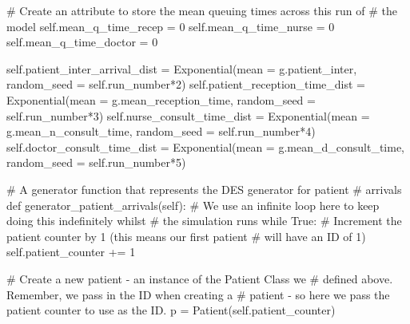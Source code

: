 \documentclass[
  letterpaper,
  DIV=11,
  numbers=noendperiod]{scrreprt}
\newenvironment{Shaded}{}{}
\newcommand{\CommentTok}[1]{\textcolor[rgb]{0.42,0.45,0.49}{#1}}
\newcommand{\ControlFlowTok}[1]{\textcolor[rgb]{0.84,0.23,0.29}{#1}}
\newcommand{\DecValTok}[1]{\textcolor[rgb]{0.00,0.36,0.77}{#1}}
\newcommand{\KeywordTok}[1]{\textcolor[rgb]{0.84,0.23,0.29}{#1}}
\newcommand{\NormalTok}[1]{\textcolor[rgb]{0.14,0.16,0.18}{#1}}
\newcommand{\OperatorTok}[1]{\textcolor[rgb]{0.14,0.16,0.18}{#1}}
\newcommand{\VariableTok}[1]{\textcolor[rgb]{0.89,0.38,0.04}{#1}}
\begin{document}
\begin{tcolorbox}
\begin{Shaded}
\begin{Highlighting}[]
        \CommentTok{\# Create an attribute to store the mean queuing times across this run of}
        \CommentTok{\# the model}
        \VariableTok{self}\NormalTok{.mean\_q\_time\_recep }\OperatorTok{=} \DecValTok{0}
        \VariableTok{self}\NormalTok{.mean\_q\_time\_nurse }\OperatorTok{=} \DecValTok{0}
        \VariableTok{self}\NormalTok{.mean\_q\_time\_doctor }\OperatorTok{=} \DecValTok{0}

        \VariableTok{self}\NormalTok{.patient\_inter\_arrival\_dist }\OperatorTok{=}\NormalTok{ Exponential(mean }\OperatorTok{=}\NormalTok{ g.patient\_inter, random\_seed }\OperatorTok{=} \VariableTok{self}\NormalTok{.run\_number}\OperatorTok{*}\DecValTok{2}\NormalTok{)}
        \VariableTok{self}\NormalTok{.patient\_reception\_time\_dist }\OperatorTok{=}\NormalTok{ Exponential(mean }\OperatorTok{=}\NormalTok{ g.mean\_reception\_time, random\_seed }\OperatorTok{=} \VariableTok{self}\NormalTok{.run\_number}\OperatorTok{*}\DecValTok{3}\NormalTok{)}
        \VariableTok{self}\NormalTok{.nurse\_consult\_time\_dist }\OperatorTok{=}\NormalTok{ Exponential(mean }\OperatorTok{=}\NormalTok{ g.mean\_n\_consult\_time, random\_seed }\OperatorTok{=} \VariableTok{self}\NormalTok{.run\_number}\OperatorTok{*}\DecValTok{4}\NormalTok{)}
        \VariableTok{self}\NormalTok{.doctor\_consult\_time\_dist }\OperatorTok{=}\NormalTok{ Exponential(mean }\OperatorTok{=}\NormalTok{ g.mean\_d\_consult\_time, random\_seed }\OperatorTok{=} \VariableTok{self}\NormalTok{.run\_number}\OperatorTok{*}\DecValTok{5}\NormalTok{)}

    \CommentTok{\# A generator function that represents the DES generator for patient}
    \CommentTok{\# arrivals}
    \KeywordTok{def}\NormalTok{ generator\_patient\_arrivals(}\VariableTok{self}\NormalTok{):}
        \CommentTok{\# We use an infinite loop here to keep doing this indefinitely whilst}
        \CommentTok{\# the simulation runs}
        \ControlFlowTok{while} \VariableTok{True}\NormalTok{:}
            \CommentTok{\# Increment the patient counter by 1 (this means our first patient}
            \CommentTok{\# will have an ID of 1)}
            \VariableTok{self}\NormalTok{.patient\_counter }\OperatorTok{+=} \DecValTok{1}

            \CommentTok{\# Create a new patient {-} an instance of the Patient Class we}
            \CommentTok{\# defined above.  Remember, we pass in the ID when creating a}
            \CommentTok{\# patient {-} so here we pass the patient counter to use as the ID.}
\NormalTok{            p }\OperatorTok{=}\NormalTok{ Patient(}\VariableTok{self}\NormalTok{.patient\_counter)}


\end{Highlighting}
\end{Shaded}
\end{tcolorbox}
\end{document}
